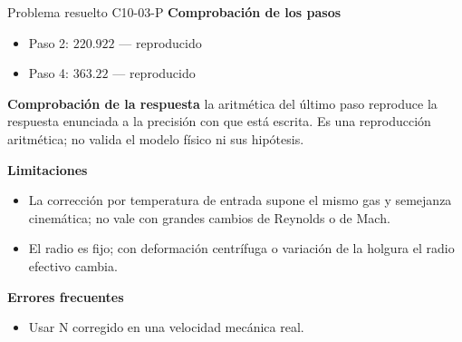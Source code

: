 \documentclass[10pt,openany]{book}
\begin{document}
\begin{studiumworked}{Problema resuelto C10-03-P}
\noindent\textbf{Comprobación de los pasos}
\begin{itemize}
\item Paso 2: $220.922$ — reproducido
\item Paso 4: $363.22$ — reproducido
\end{itemize}

\noindent\textbf{Comprobación de la respuesta} la aritmética del último paso reproduce la respuesta enunciada a la precisión con que está escrita. Es una reproducción aritmética; no valida el modelo físico ni sus hipótesis.

\noindent\textbf{Limitaciones}
\begin{itemize}
\item La corrección por temperatura de entrada supone el mismo gas y semejanza cinemática; no vale con grandes cambios de Reynolds o de Mach.
\item El radio es fijo; con deformación centrífuga o variación de la holgura el radio efectivo cambia.
\end{itemize}

\noindent\textbf{Errores frecuentes}
\begin{itemize}
\item Usar N corregido en una velocidad mecánica real.
\end{itemize}
\end{studiumworked}
\end{document}
